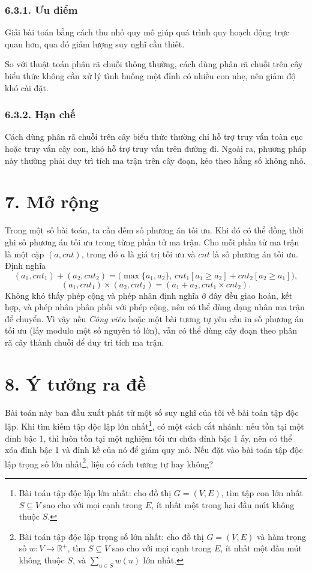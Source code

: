 \documentclass[11pt]{article}
\begin{document}
\subsubsection*{6.3.1. Ưu điểm}

Giải bài toán bằng cách thu nhỏ quy mô giúp quá trình quy hoạch động trực quan
hơn, qua đó giảm lượng suy nghĩ cần thiết.

So với thuật toán phân rã chuỗi thông thường, cách dùng phân rã chuỗi trên
cây biểu thức không cần xử lý tình huống một đỉnh có nhiều con nhẹ, nên giảm
độ khó cài đặt.

\subsubsection*{6.3.2. Hạn chế}

Cách dùng phân rã chuỗi trên cây biểu thức thường chỉ hỗ trợ truy vấn toàn cục
hoặc truy vấn cây con, khó hỗ trợ truy vấn trên đường đi. Ngoài ra, phương
pháp này thường phải duy trì tích ma trận trên cây đoạn, kéo theo hằng số
không nhỏ.

\section*{7. Mở rộng}

Trong một số bài toán, ta cần đếm số phương án tối ưu. Khi đó có thể đồng thời
ghi số phương án tối ưu trong từng phần tử ma trận. Cho mỗi phần tử ma trận là
một cặp \((a,\mathit{cnt})\), trong đó \(a\) là giá trị tối ưu và
\(\mathit{cnt}\) là số phương án tối ưu. Định nghĩa
\[
(a_1,\mathit{cnt}_1)+(a_2,\mathit{cnt}_2)
=\bigl(\max\{a_1,a_2\},\,
\mathit{cnt}_1[a_1\ge a_2]+\mathit{cnt}_2[a_2\ge a_1]\bigr),
\]
\[
(a_1,\mathit{cnt}_1)\times(a_2,\mathit{cnt}_2)
=(a_1+a_2,\mathit{cnt}_1\times\mathit{cnt}_2).
\]
Không khó thấy phép cộng và phép nhân định nghĩa ở đây đều giao hoán, kết hợp,
và phép nhân phân phối với phép cộng, nên có thể dùng dạng nhân ma trận để
chuyển. Vì vậy nếu \emph{Công viên} hoặc một bài tương tự yêu cầu in số
phương án tối ưu (lấy modulo một số nguyên tố lớn), vẫn có thể dùng cây đoạn
theo phân rã cây thành chuỗi để duy trì tích ma trận.

\section*{8. Ý tưởng ra đề}

Bài toán này ban đầu xuất phát từ một số suy nghĩ của tôi về bài toán tập độc
lập. Khi tìm kiếm tập độc lập lớn nhất\footnote{Bài toán tập độc lập lớn nhất:
cho đồ thị \(G=(V,E)\), tìm tập con lớn nhất \(S\subseteq V\) sao cho với mọi
cạnh trong \(E\), ít nhất một trong hai đầu mút không thuộc \(S\).}, có một
cách cắt nhánh: nếu tồn tại một đỉnh bậc 1, thì luôn tồn tại một nghiệm tối
ưu chứa đỉnh bậc 1 ấy, nên có thể xóa đỉnh bậc 1 và đỉnh kề của nó để giảm
quy mô. Nếu đặt vào bài toán tập độc lập trọng số lớn nhất\footnote{Bài toán
tập độc lập trọng số lớn nhất: cho đồ thị \(G=(V,E)\) và hàm trọng số
\(w:V\to\mathbb R^+\), tìm \(S\subseteq V\) sao cho với mọi cạnh trong \(E\),
ít nhất một đầu mút không thuộc \(S\), và \(\sum_{u\in S}w(u)\) lớn nhất.},
liệu có cách tương tự hay không?
\end{document}
